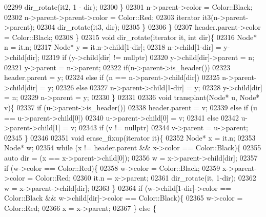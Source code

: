 \begin{DoxyCode}
02299                     dir\_rotate(it2, 1 - dir);
02300                 \}
02301                 n->parent->color = Color::Black;
02302                 n->parent->parent->color = Color::Red;
02303                 iterator it3(n->parent->parent);
02304                 dir\_rotate(it3, dir);
02305             \}
02306         \}
02307         header.parent->color = Color::Black;
02308     \}
02315     \textcolor{keywordtype}{void} dir\_rotate(iterator it, \textcolor{keywordtype}{int} dir)\{
02316         Node* n = it.n;
02317         Node* y = it.n->child[1-dir];
02318         n->child[1-dir] = y->child[dir];
02319         \textcolor{keywordflow}{if} (y->child[dir] != \textcolor{keyword}{nullptr})
02320             y->child[dir]->parent = n;
02321         y->parent = n->parent;
02322         \textcolor{keywordflow}{if}(n->parent->is\_header())
02323             header.parent = y;
02324         \textcolor{keywordflow}{else} if (n == n->parent->child[dir])
02325             n->parent->child[dir] = y;
02326         \textcolor{keywordflow}{else}
02327             n->parent->child[1-dir] = y;
02328         y->child[dir] = n;
02329         n->parent = y;
02330     \}
02331 
02336     \textcolor{keywordtype}{void} transplant(Node* u, Node* v)\{
02337         \textcolor{keywordflow}{if} (u->parent->is\_header())
02338             header.parent = v;
02339         \textcolor{keywordflow}{else} if (u == u->parent->child[0])
02340             u->parent->child[0] = v;
02341         \textcolor{keywordflow}{else}
02342             u->parent->child[1] = v;
02343         \textcolor{keywordflow}{if} (v != \textcolor{keyword}{nullptr})
02344             v->parent = u->parent;
02345     \}
02346 
02351     \textcolor{keywordtype}{void} erase\_fixup(iterator it)\{
02352         Node* x = it.n;
02353         Node* w;
02354         \textcolor{keywordflow}{while} (x != header.parent && x->color == Color::Black)\{
02355             \textcolor{keyword}{auto} dir = (x == x->parent->child[0]);
02356             w = x->parent->child[dir];
02357             \textcolor{keywordflow}{if} (w->color == Color::Red)\{
02358                 w->color = Color::Black;
02359                 x->parent->color = Color::Red;
02360                 it.n = x->parent;
02361                 dir\_rotate(it, 1-dir);
02362                 w = x->parent->child[dir];
02363             \}
02364             \textcolor{keywordflow}{if} (w->child[1-dir]->color == Color::Black && w->child[dir]->color 
      == Color::Black)\{
02365                 w->color = Color::Red;
02366                 x = x->parent;
02367             \} \textcolor{keywordflow}{else} \{

\end{DoxyCode}
